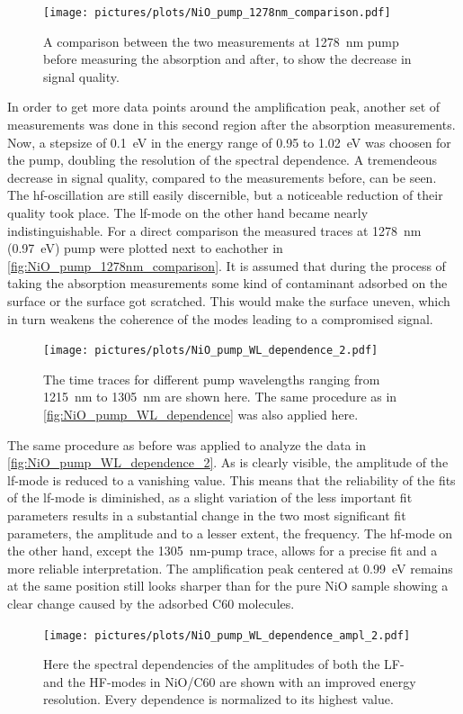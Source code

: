 \begin{figure}[ht]
    \centering
    \texttt{[image: pictures/plots/NiO\_pump\_1278nm\_comparison.pdf]}
    \caption{A comparison between the two measurements at \qty{1278}{nm} pump before measuring the absorption and after, to show the decrease in signal quality.}
    \label{fig:NiO_pump_1278nm_comparison}
\end{figure}
In order to get more data points around the amplification peak, another set of measurements was done in this second region after the absorption measurements.
Now, a stepsize of \qty{0.1}{eV} in the energy range of 0.95 to \qty{1.02}{eV} was choosen for the pump, doubling the resolution of the spectral dependence.
A tremendeous decrease in signal quality, compared to the measurements before, can be seen.
The hf-oscillation are still easily discernible, but a noticeable reduction of their quality took place.
The lf-mode on the other hand became nearly indistinguishable.
For a direct comparison the measured traces at \qty{1278}{nm} (\qty{0.97}{eV}) pump were plotted next to eachother in \autoref{fig:NiO_pump_1278nm_comparison}.
It is assumed that during the process of taking the absorption measurements some kind of contaminant adsorbed on the surface or the surface got scratched.
This would make the surface uneven, which in turn weakens the coherence of the modes leading to a compromised signal.
\begin{figure}[ht]
    \centering
    \texttt{[image: pictures/plots/NiO\_pump\_WL\_dependence\_2.pdf]}
    \caption{The time traces for different pump wavelengths ranging from \qty{1215}{nm} to \qty{1305}{nm} are shown here. The same procedure as in \autoref{fig:NiO_pump_WL_dependence} was also applied here.}
    \label{fig:NiO_pump_WL_dependence_2}
\end{figure}

The same procedure as before was applied to analyze the data in \autoref{fig:NiO_pump_WL_dependence_2}.
As is clearly visible, the amplitude of the lf-mode is reduced to a vanishing value.
This means that the reliability of the fits of the lf-mode is diminished, as a slight variation of the less important fit parameters results in a substantial change in the two most significant fit parameters, the amplitude and to a lesser extent, the frequency.
The hf-mode on the other hand, except the \qty{1305}{nm}-pump trace, allows for a precise fit and a more reliable interpretation.
The amplification peak centered at \qty{0.99}{eV} remains at the same position still looks sharper than for the pure NiO sample showing a clear change caused by the adsorbed C60 molecules.
\begin{figure}[ht]
    \centering
    \texttt{[image: pictures/plots/NiO\_pump\_WL\_dependence\_ampl\_2.pdf]}
    \caption{Here the spectral dependencies of the amplitudes of both the LF- and the HF-modes in NiO/C60 are shown with an improved energy resolution. Every dependence is normalized to its highest value.}
    \label{fig:NiO_pump_WL_dependence_ampl_2}
\end{figure}
\FloatBarrier

